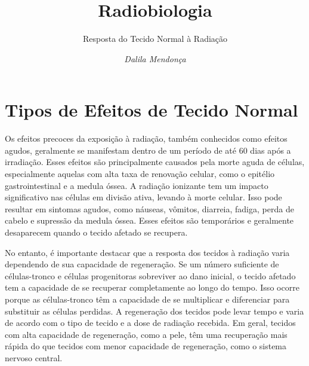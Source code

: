 \documentclass[11pt,a4paper]{article}
\title{\LobsterTwo\Huge{Radiobiologia}}
\author{\LobsterTwo\Large{Resposta do Tecido Normal à Radiação}\nocite{*}}
\date{\LobsterTwo\textit{Dalila Mendonça}}
\begin{document}
	\maketitle



\section{Tipos de Efeitos de Tecido Normal}

	Os efeitos precoces da exposição à radiação, também conhecidos como efeitos agudos, geralmente se manifestam dentro de um período de até 60 dias após a irradiação. Esses efeitos são principalmente causados pela morte aguda de células, especialmente aquelas com alta taxa de renovação celular, como o epitélio gastrointestinal e a medula óssea. A radiação ionizante tem um impacto significativo nas células em divisão ativa, levando à morte celular. Isso pode resultar em sintomas agudos, como náuseas, vômitos, diarreia, fadiga, perda de cabelo e supressão da medula óssea. Esses efeitos são temporários e geralmente desaparecem quando o tecido afetado se recupera.

	No entanto, é importante destacar que a resposta dos tecidos à radiação varia dependendo de sua capacidade de regeneração. Se um número suficiente de células-tronco e células progenitoras sobreviver ao dano inicial, o tecido afetado tem a capacidade de se recuperar completamente ao longo do tempo. Isso ocorre porque as células-tronco têm a capacidade de se multiplicar e diferenciar para substituir as células perdidas. A regeneração dos tecidos pode levar tempo e varia de acordo com o tipo de tecido e a dose de radiação recebida. Em geral, tecidos com alta capacidade de regeneração, como a pele, têm uma recuperação mais rápida do que tecidos com menor capacidade de regeneração, como o sistema nervoso central.
\end{document}
